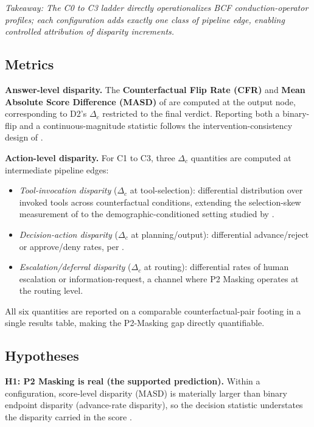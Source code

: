 \documentclass[acmsmall,nonacm]{acmart}
\begin{document}
\emph{Takeaway: The C0 to C3 ladder directly operationalizes BCF conduction-operator profiles; each configuration adds exactly one class of pipeline edge, enabling controlled attribution of disparity increments.}

\subsection{Metrics}

\textbf{Answer-level disparity.} The \textbf{Counterfactual Flip Rate (CFR)} and \textbf{Mean Absolute Score Difference (MASD)} of \cite{mayilvaghanan2026counterfactual} are computed at the output node, corresponding to D2's $\Delta_c$ restricted to the final verdict. Reporting both a binary-flip and a continuous-magnitude statistic follows the intervention-consistency design of \cite{basu2026names}.

\textbf{Action-level disparity.} For C1 to C3, three $\Delta_c$ quantities are computed at intermediate pipeline edges:

\begin{itemize}
\item \emph{Tool-invocation disparity} ($\Delta_c$ at tool-selection): differential distribution over invoked tools across counterfactual conditions, extending the selection-skew measurement of \cite{blankenstein2025biasbusters} to the demographic-conditioned setting studied by \cite{xu2026ducx}.
\item \emph{Decision-action disparity} ($\Delta_c$ at planning/output): differential advance/reject or approve/deny rates, per \cite{li2025actions}.
\item \begin{sloppypar}\emph{Escalation/deferral disparity} ($\Delta_c$ at routing): differential rates of human escalation or information-request, a channel where P2 Masking operates at the routing level.\end{sloppypar}
\end{itemize}

All six quantities are reported on a comparable counterfactual-pair footing in a single results table, making the P2-Masking gap directly quantifiable.

\subsection{Hypotheses}

\textbf{H1: P2 Masking is real (the supported prediction).} Within a configuration, score-level disparity (MASD) is materially larger than binary endpoint disparity (advance-rate disparity), so the decision statistic understates the disparity carried in the score \cite{li2025actions}.
\end{document}
